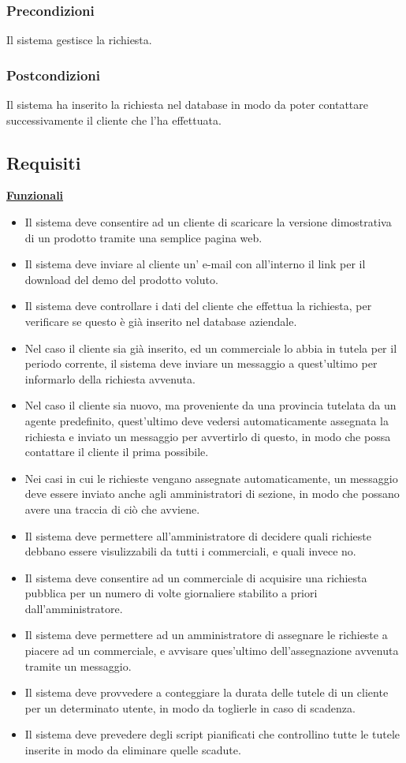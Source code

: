\subsubsection*{Precondizioni} Il sistema gestisce la richiesta.
\subsubsection*{Postcondizioni} Il sistema ha inserito la richiesta nel database in modo da poter contattare successivamente il cliente che l'ha effettuata.

\subsection{Requisiti}
\underline{\textbf{Funzionali}}
\begin{itemize}
  \item Il sistema deve consentire ad un cliente di scaricare la versione dimostrativa di un prodotto tramite una semplice pagina web.
  \item Il sistema deve inviare al cliente un' e-mail con all'interno il link per il download del demo del prodotto voluto. 
  \item Il sistema deve controllare i dati del cliente che effettua la richiesta, per verificare se questo \`e gi\`a inserito nel database aziendale.
  \item Nel caso il cliente sia gi\`a inserito, ed un commerciale lo abbia in tutela per il periodo corrente, il sistema deve inviare un messaggio a quest'ultimo per informarlo della richiesta avvenuta.
  \item Nel caso il cliente sia nuovo, ma proveniente da una provincia tutelata da un agente predefinito, quest'ultimo deve vedersi automaticamente assegnata la richiesta e inviato un messaggio per avvertirlo di questo, in modo che possa contattare il cliente il prima possibile.
  \item Nei casi in cui le richieste vengano assegnate automaticamente, un messaggio deve essere inviato anche agli amministratori di sezione, in modo che possano avere una traccia di ci\`o che avviene.
  \item Il sistema deve permettere all'amministratore di decidere quali richieste debbano essere visulizzabili da tutti i commerciali, e quali invece no.
  \item Il sistema deve consentire ad un commerciale di acquisire una richiesta pubblica per un numero di volte giornaliere stabilito a priori dall'amministratore.
  \item Il sistema deve permettere ad un amministratore di assegnare le richieste a piacere ad un commerciale, e avvisare ques'ultimo dell'assegnazione avvenuta tramite un messaggio.
  \item Il sistema deve provvedere a conteggiare la durata delle tutele di un cliente per un determinato utente, in modo da toglierle in caso di scadenza.
  \item Il sistema deve prevedere degli script pianificati che controllino tutte le tutele inserite in modo da eliminare quelle scadute.
\end{itemize}

